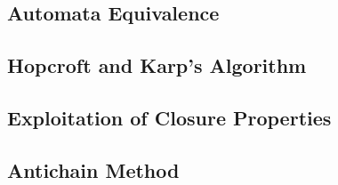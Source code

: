 \subsection{Automata Equivalence}

\subsection{Hopcroft and Karp's Algorithm}

\subsection{Exploitation of Closure Properties}

\subsection{Antichain Method}
